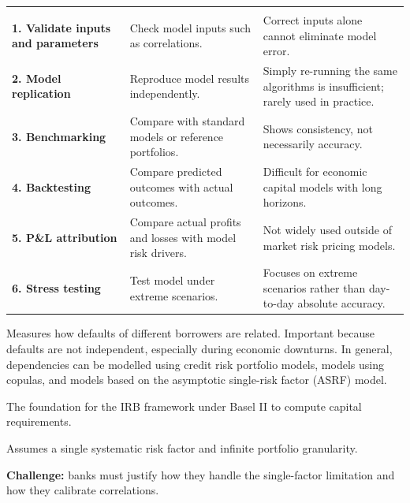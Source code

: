 \noindent\begin{minipage}{\textwidth}
\renewcommand{\arraystretch}{1.3}
\begin{tabularx}{\textwidth}{@{}L{0.26\textwidth}YY@{}}
  &  & \\
{\tabfont \textbf{1. Validate inputs and parameters}} & {\tabfont Check model inputs such as correlations.} & {\tabfont Correct inputs alone cannot eliminate model error.}\\
{\tabfont \textbf{2. Model replication}} & {\tabfont Reproduce model results independently.} & {\tabfont Simply re-running the same algorithms is insufficient; rarely used in practice.}\\
{\tabfont \textbf{3. Benchmarking}} & {\tabfont Compare with standard models or reference portfolios.} & {\tabfont Shows consistency, not necessarily accuracy.}\\
{\tabfont \textbf{4. Backtesting}} & {\tabfont Compare predicted outcomes with actual outcomes.} & {\tabfont Difficult for economic capital models with long horizons.}\\
{\tabfont \textbf{5. P\&L attribution}} & {\tabfont Compare actual profits and losses with model risk drivers.} & {\tabfont Not widely used outside of market risk pricing models.}\\
{\tabfont \textbf{6. Stress testing}} & {\tabfont Test model under extreme scenarios.} & {\tabfont Focuses on extreme scenarios rather than day-to-day absolute accuracy.}\\
\end{tabularx}
\end{minipage}


Measures how defaults of different borrowers are related. Important because
defaults are not independent, especially during economic downturns. In general,
dependencies can be modelled using credit risk portfolio models, models using
copulas, and models based on the asymptotic single-risk factor (ASRF) model.


The foundation for the IRB framework under Basel II to compute capital
requirements.

\begin{checks}
\item Assumes a single systematic risk factor and infinite portfolio granularity.
\item \textbf{Challenge:} banks must justify how they handle the single-factor
limitation and how they calibrate correlations.
\end{checks}

